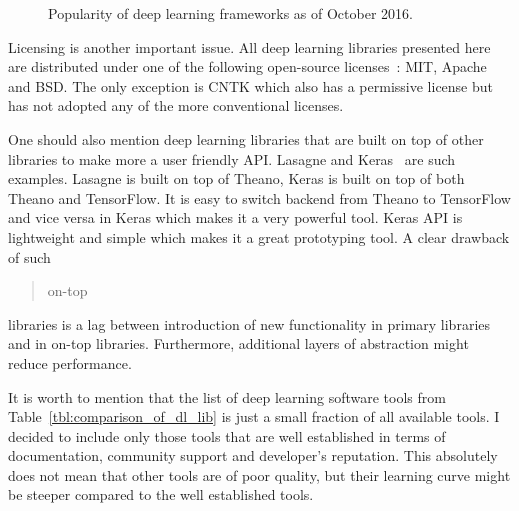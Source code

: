 \documentclass[a4paper, 11pt, table]{article}
\begin{document}
\begin{figure}[H]
\centering


\caption{\label{fig:framework_popularity}Popularity of deep learning frameworks as of October 2016.}
\end{figure}

Licensing is another important issue. All deep learning libraries presented here are distributed under one of the following open-source licenses~\cite{Rosen:2004:OSL:1014911}: MIT, Apache and BSD. The only exception is CNTK which also has a permissive license but has not adopted any of the more conventional licenses.

One should also mention deep learning libraries that are built on top of other libraries to make more a user friendly API. Lasagne and Keras~\cite{chollet2015keras} are such examples. Lasagne is built on top of Theano, Keras is built on top of both Theano and TensorFlow. It is easy to switch backend from Theano to TensorFlow and vice versa in Keras which makes it a very powerful tool. Keras API is lightweight and simple which makes it a great prototyping tool. A clear drawback of such \blockquote{on-top} libraries is a lag between introduction of new functionality in primary libraries and in on-top libraries. Furthermore, additional layers of abstraction might reduce performance. 

It is worth to mention that the list of deep learning software tools from Table~\ref{tbl:comparison_of_dl_lib} is just a small fraction of all available tools. I decided to include only those tools that are well established in terms of documentation, community support and developer's reputation. This absolutely does not mean that other tools are of poor quality, but their learning curve might be steeper compared to the well established tools.
\end{document}
